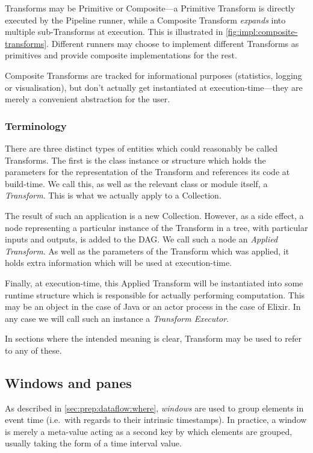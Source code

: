 Transforms may be Primitive or Composite---a Primitive Transform is directly executed by the Pipeline runner, while a Composite Transform \emph{expands} into multiple sub-Transforms at execution.
This is illustrated in \cref{fig:impl:composite-transforms}.
Different runners may choose to implement different Transforms as primitives and provide composite implementations for the rest.

Composite Transforms are tracked for informational purposes (statistics, logging or visualisation), but don't actually get instantiated at execution-time---they are merely a convenient abstraction for the user.

\subsubsection{Terminology}

There are three distinct types of entities which could reasonably be called Transforms.
The first is the class instance or structure which holds the parameters for the representation of the Transform and references its code at build-time.
We call this, as well as the relevant class or module itself, a \emph{Transform}.
This is what we actually apply to a Collection.

The result of such an application is a new Collection.
However, as a side effect, a node representing a particular instance of the Transform in a tree, with particular inputs and outputs, is added to the DAG.
We call such a node an \emph{Applied Transform}.
As well as the parameters of the Transform which was applied, it holds extra information which will be used at execution-time.

Finally, at execution-time, this Applied Transform will be instantiated into some runtime structure which is responsible for actually performing computation.
This may be an object in the case of Java or an actor process in the case of Elixir.
In any case we will call such an instance a \emph{Transform Executor}.

In sections where the intended meaning is clear, Transform may be used to refer to any of these.

\subsection{Windows and panes}\label{sec:impl:dataflow:windows-panes}

As described in \cref{sec:prep:dataflow:where}, \emph{windows} are used to group elements in event time (i.e.\ with regards to their intrinsic timestamps).
In practice, a window is merely a meta-value acting as a second key by which elements are grouped, usually taking the form of a time interval value.

